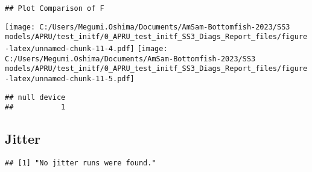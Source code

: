 \documentclass[
]{article}
\begin{document}
\begin{verbatim}
## Plot Comparison of F
\end{verbatim}

\texttt{[image: C:/Users/Megumi.Oshima/Documents/AmSam-Bottomfish-2023/SS3 models/APRU/test\_initf/0\_APRU\_test\_initf\_SS3\_Diags\_Report\_files/figure-latex/unnamed-chunk-11-4.pdf]}
\texttt{[image: C:/Users/Megumi.Oshima/Documents/AmSam-Bottomfish-2023/SS3 models/APRU/test\_initf/0\_APRU\_test\_initf\_SS3\_Diags\_Report\_files/figure-latex/unnamed-chunk-11-5.pdf]}

\begin{verbatim}
## null device 
##           1
\end{verbatim}

\hypertarget{jitter}{%
\subsection{Jitter}\label{jitter}}

\begin{verbatim}
## [1] "No jitter runs were found."
\end{verbatim}

\hypertarget{section}{%
\subsection{}\label{section}}
\end{document}
